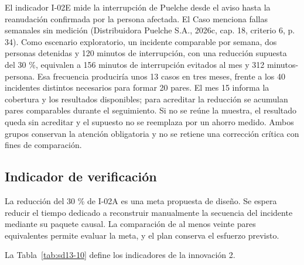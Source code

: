 El indicador I-02E mide la interrupción de Puelche desde el aviso hasta la reanudación confirmada por la persona afectada. El Caso menciona fallas semanales sin medición (Distribuidora Puelche S.A., 2026c, cap. 18, criterio 6, p. 34). Como escenario exploratorio, un incidente comparable por semana, dos personas detenidas y 120 minutos de interrupción, con una reducción supuesta del 30 \%, equivalen a 156 minutos de interrupción evitados al mes y 312 minutos-persona. Esa frecuencia produciría unos 13 casos en tres meses, frente a los 40 incidentes distintos necesarios para formar 20 pares. El mes 15 informa la cobertura y los resultados disponibles; para acreditar la reducción se acumulan pares comparables durante el seguimiento. Si no se reúne la muestra, el resultado queda sin acreditar y el supuesto no se reemplaza por un ahorro medido. Ambos grupos conservan la atención obligatoria y no se retiene una corrección crítica con fines de comparación.

\subsection{Indicador de verificación}

La reducción del 30 \% de I-02A es una meta propuesta de diseño. Se espera reducir el tiempo dedicado a reconstruir manualmente la secuencia del incidente mediante su paquete causal. La comparación de al menos veinte pares equivalentes permite evaluar la meta, y el plan conserva el esfuerzo previsto.

La Tabla~\ref{tab:sd13-10} define los indicadores de la innovación 2.

